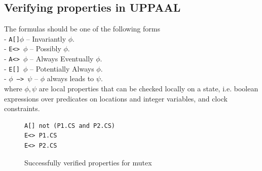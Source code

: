 \subsection{Verifying properties in UPPAAL}

\begin{definition}
The formulas should be one of the following forms\\
- \texttt{A[]$\phi$} -- Invariantly $\phi$.\\
- \texttt{E<> $\phi$} -- Possibly $\phi$.\\
- \texttt{A<> $\phi$} -- Always Eventually $\phi$.\\
- \texttt{E[] $\phi$} -- Potentially Always $\phi$.\\
- \texttt{$\phi$ --> $\psi$} -- $\phi$ always leads to $\psi$.\\
where $\phi, \psi$ are local properties that can be checked locally on a state, i.e. boolean expressions over predicates on locations and integer variables, and clock constraints.
\label{def:quantifiers}
\end{definition}


\begin{figure}[H]
\caption{Successfully verified properties for mutex \cite{SmallTutorial2009}}
\label{fig:mutex_verification}
\begin{lstlisting}[style=code]
A[] not (P1.CS and P2.CS)
E<> P1.CS
E<> P2.CS
\end{lstlisting}    
\end{figure}